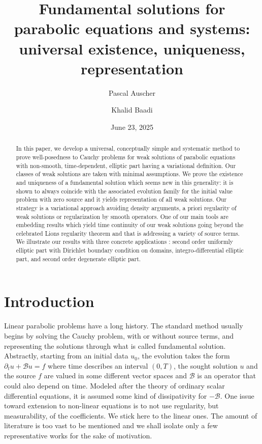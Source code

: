 \documentclass[11pt, letterpaper]{amsart}
\author{Pascal Auscher}
\author{Khalid Baadi}
\date{June 23, 2025}
\title[Fundamental solutions for parabolic systems]{Fundamental solutions for parabolic equations and systems:
universal existence, uniqueness, representation}
\theoremstyle{definition}
\theoremstyle{remark}
\numberwithin{equation}{section}
\begin{document}
\begin{abstract}
In this paper, we develop a universal, conceptually simple and systematic method to prove well-posedness to Cauchy problems for weak solutions of parabolic equations with non-smooth, time-dependent, elliptic part having a variational definition. Our classes of weak solutions are taken with minimal assumptions.  We prove the existence and uniqueness of a fundamental solution which seems new in this generality: it is shown to always coincide with the associated evolution family for the initial value problem with zero source and it yields representation of all weak solutions. Our strategy is a variational approach avoiding density arguments, a priori regularity of weak solutions or regularization by smooth operators. One of our main tools are  embedding results which yield time continuity of our weak solutions going beyond the celebrated Lions regularity theorem and that is addressing a variety of source terms.   We illustrate our results with  three concrete applications : second order uniformly elliptic part with Dirichlet boundary condition on domains, integro-differential elliptic part, and second order degenerate elliptic part. 
\end{abstract}
\maketitle

\tableofcontents

\section{Introduction}\label{Section 1} 





Linear parabolic problems have a long history. The standard method usually begins by solving the Cauchy problem, with or without source terms, and representing the solutions through what is called fundamental solution. Abstractly, starting from an initial data $u_{0}$, the evolution takes the form $ \partial_t u + \mathcal{B}u =f$
where time describes an interval $(0,T)$, the sought solution $u$ and the source $f$ are valued in some different  vector spaces and $\mathcal{B}$ is an operator  that could also depend on time. Modeled after the theory of  ordinary scalar differential equations, it is assumed some kind of dissipativity for $-\mathcal{B}$. One issue toward extension to non-linear equations is to not use regularity, but measurability, of the coefficients. We stick here to the linear ones. 
The amount of literature is too vast to be mentioned and we shall isolate only a few representative works for the sake of motivation. 
\end{document}
